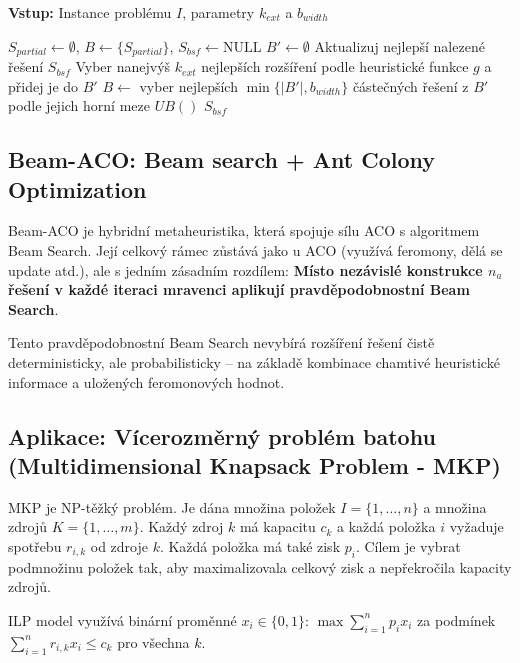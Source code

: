 \documentclass[12pt,a4paper]{article}
\theoremstyle{definition}
\begin{document}
\begin{algorithm}[H]
\caption{Beam Search (pro maximalizaci)}
\textbf{Vstup:} Instance problému $I$, parametry $k_{ext}$ a $b_{width}$
\begin{algorithmic}[1]
\STATE $S_{partial} \gets \emptyset$, $B \gets \{S_{partial}\}$, $S_{bsf} \gets \text{NULL}$
    \STATE $B' \gets \emptyset$
            \STATE Aktualizuj nejlepší nalezené řešení $S_{bsf}$
        \ELSE
            \STATE Vyber nanejvýš $k_{ext}$ nejlepších rozšíření podle heuristické funkce $g$ a přidej je do $B'$
        \ENDIF
    \ENDFOR
    \STATE $B \gets$ vyber nejlepších $\min\{|B'|, b_{width}\}$ částečných řešení z $B'$ podle jejich horní meze $UB()$
\ENDWHILE
\RETURN $S_{bsf}$
\end{algorithmic}
\end{algorithm}

\subsection{Beam-ACO: Beam search + Ant Colony Optimization}
Beam-ACO je hybridní metaheuristika, která spojuje sílu ACO s algoritmem Beam Search. Její celkový rámec zůstává jako u ACO (využívá feromony, dělá se update atd.), ale s jedním zásadním rozdílem: \textbf{Místo nezávislé konstrukce $n_a$ řešení v každé iteraci mravenci aplikují pravděpodobnostní Beam Search}. 

Tento pravděpodobnostní Beam Search nevybírá rozšíření řešení čistě deterministicky, ale probabilisticky – na základě kombinace chamtivé heuristické informace a uložených feromonových hodnot. 

\subsection{Aplikace: Vícerozměrný problém batohu (Multidimensional Knapsack Problem - MKP)}
MKP je NP-těžký problém. Je dána množina položek $I = \{1, \dots, n\}$ a množina zdrojů $K = \{1, \dots, m\}$. Každý zdroj $k$ má kapacitu $c_k$ a každá položka $i$ vyžaduje spotřebu $r_{i,k}$ od zdroje $k$. Každá položka má také zisk $p_i$. Cílem je vybrat podmnožinu položek tak, aby maximalizovala celkový zisk a nepřekročila kapacity zdrojů.

ILP model využívá binární proměnné $x_i \in \{0,1\}$: $\max \sum_{i=1}^{n} p_i x_i$ za podmínek $\sum_{i=1}^{n} r_{i,k} x_i \le c_k$ pro všechna $k$.
\end{document}
